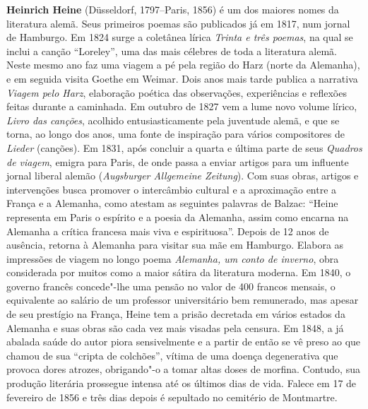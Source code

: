\textbf{Heinrich Heine} (Düsseldorf, 1797--Paris, 1856) é um dos maiores nomes
da literatura alemã. Seus primeiros poemas são publicados já
em 1817, num jornal de Hamburgo. Em 1824 surge a coletânea lírica
\textit{Trinta e três poemas}, na qual se inclui a canção “Loreley”,
uma das mais célebres de toda a literatura alemã. Neste mesmo ano faz
uma viagem a pé pela região do Harz (norte da Alemanha), e em seguida
visita Goethe em Weimar. Dois anos mais tarde publica a narrativa
\textit{Viagem pelo Harz}, elaboração poética das observações,
experiências e reflexões feitas durante a caminhada. Em outubro de 1827
vem a lume novo volume lírico, \textit{Livro das canções}, acolhido
entusiasticamente pela juventude alemã, e que se torna, ao longo dos
anos, uma fonte de inspiração para vários compositores de
\textit{Lieder} (canções).
Em 1831, após concluir a quarta e última parte de seus \textit{Quadros
de viagem}, emigra para Paris, de onde passa a enviar artigos para um
influente jornal liberal alemão (\textit{Augsburger Allgemeine
Zeitung}). Com suas obras, artigos e intervenções busca promover o
intercâmbio cultural e a aproximação entre a França e a Alemanha, como
atestam as seguintes palavras de Balzac: “Heine representa em Paris o
espírito e a poesia da Alemanha, assim como encarna na Alemanha a
crítica francesa mais viva e espirituosa”. Depois de 12 anos de
ausência, retorna à Alemanha para visitar sua mãe em Hamburgo. Elabora
as impressões de viagem no longo poema \textit{Alemanha, um conto de
inverno}, obra considerada por muitos como a maior sátira da literatura moderna.
Em 1840, o governo francês concede"-lhe uma pensão no valor de 400 francos
mensais, o equivalente ao salário de um professor universitário bem remunerado,
mas apesar de seu prestígio na França, Heine tem a prisão decretada em vários
estados da Alemanha e suas obras são cada vez mais visadas pela censura.
Em 1848, a já abalada saúde do autor piora sensivelmente
e a partir de então se vê preso ao que chamou de sua “cripta de
colchões”, vítima de uma doença degenerativa que provoca dores atrozes,
obrigando"-o a tomar altas doses de morfina. Contudo, sua produção
literária prossegue intensa até os últimos dias de vida. Falece em 17
de fevereiro de 1856 e três dias depois é sepultado no cemitério de
Montmartre.

